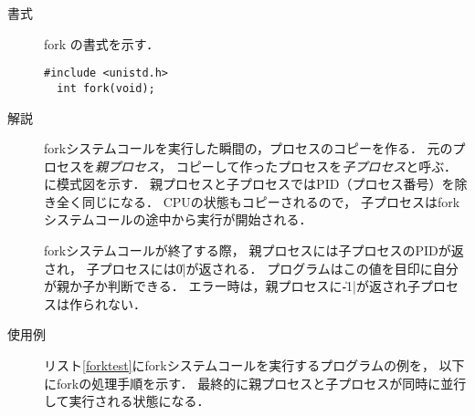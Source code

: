 \begin{description}
\item[書式] fork の書式を示す．
\begin{lstlisting}[numbers=none]
  #include <unistd.h>
  int fork(void);
\end{lstlisting}

\item[解説] forkシステムコールを実行した瞬間の，プロセスのコピーを作る．
  元のプロセスを\emph{親プロセス}，
  コピーして作ったプロセスを\emph{子プロセス}と呼ぶ．
  に模式図を示す．
  親プロセスと子プロセスではPID（プロセス番号）を除き全く同じになる．
  CPUの状態もコピーされるので，
  子プロセスはforkシステムコールの途中から実行が開始される．


  forkシステムコールが終了する際，
  親プロセスには子プロセスのPIDが返され，
  子プロセスには\|0|が返される．
  プログラムはこの値を目印に自分が親か子か判断できる．
  エラー時は，親プロセスに\|-1|が返され子プロセスは作られない．

\item[使用例]
  リスト\ref{forktest}にforkシステムコールを実行するプログラムの例を，
  以下にforkの処理手順を示す．
  最終的に親プロセスと子プロセスが同時に並行して実行される状態になる．

  
  

\end{description}
